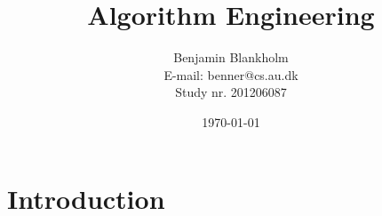 \documentclass{article}
\title{Algorithm Engineering}
\author{Benjamin Blankholm \\
		E-mail: benner@cs.au.dk \\
		Study nr. 201206087}
\date{\today}
\begin{document}
\maketitle

\section{Introduction}
\end{document}
